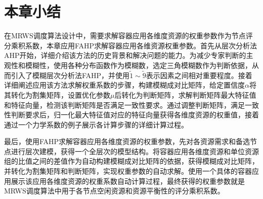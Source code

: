 \section{本章小结}
在MRWS调度算法设计中，需要求解容器应用各维度资源的权重参数作为节点评分乘积系数，本章应用FAHP求解容器应用各维资源权重参数。首先从层次分析法AHP开始，详细介绍该方法的历史背景和解决问题的能力。为减少专家判断的主观性和模糊性，使用各种分布函数作为模糊数，选定三角模糊数作为判断依据，从而引入了模糊层次分析法FAHP，并使用$\widetilde{1}\sim\widetilde{9}$表示因素之间相对重要程度。接着详细阐述应用该方法求解权重系数的步骤，构建模糊成对比矩阵，给定置信度$\alpha$将其转化为割集矩阵，设置优化参数$\mu$后转化为判断矩阵，求解判断矩阵最大特征值和特征向量，检测该判断矩阵是否满足一致性要求。通过调整判断矩阵，满足一致性判断要求后，归一化最大特征值对应的特征向量获得各维度资源的权重值，接着通过一个力学系数的例子展示各计算步骤的详细计算过程。

最后，使用FAHP求解容器应用各维度资源的权重参数，先对各资源需求和备选节点进行层次建模，获得一个全层次的模型结构。将容器应用各维度资源和单位资源组的比值之间的差值作为自动构建模糊成对比矩阵的依据，获得模糊成对比矩阵，并转化为割集矩阵和判断矩阵，实现权重参数的自动求解。使用一个具体的容器应用展示该应用各维度资源的权重系数自动计算过程，最终获得的权重参数就是MRWS调度算法中用于各节点空闲资源和资源平衡性的评分乘积系数。








